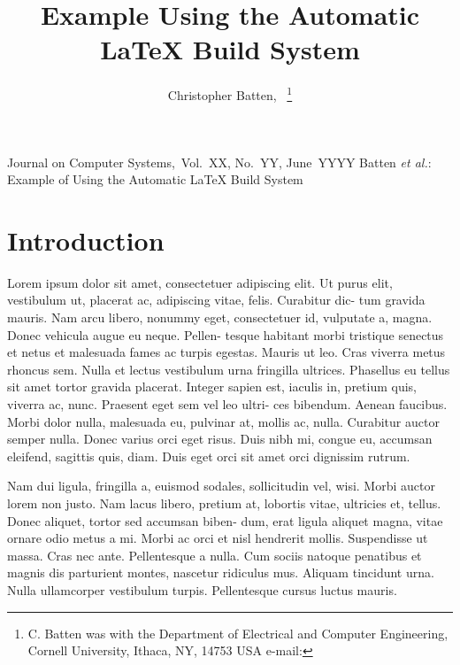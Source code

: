 \newcommand{\hackdocumentclass}{\documentclass}
\begin{document}

\title
{%
  Example Using the Automatic LaTeX Build System
}

\author
{%
  Christopher Batten,~%
  \thanks{C. Batten was with the Department of Electrical and Computer
    Engineering, Cornell University, Ithaca, NY, 14753 USA e-mail:
    }%
}

\markboth
{%
  Journal on Computer Systems,~Vol.~XX, No.~YY, June~YYYY
}%
{%
  Batten \MakeLowercase{\textit{et al.}}: Example of Using the Automatic
  LaTeX Build System
}

\maketitle





\section{Introduction}
\label{sec-intro}

 Lorem ipsum dolor sit amet, consectetuer
adipiscing elit. Ut purus elit, vestibulum ut, placerat ac, adipiscing
vitae, felis. Curabitur dic- tum gravida mauris. Nam arcu libero, nonummy
eget, consectetuer id, vulputate a, magna. Donec vehicula augue eu neque.
Pellen- tesque habitant morbi tristique senectus et netus et malesuada
fames ac turpis egestas. Mauris ut leo. Cras viverra metus rhoncus sem.
Nulla et lectus vestibulum urna fringilla ultrices. Phasellus eu tellus
sit amet tortor gravida placerat. Integer sapien est, iaculis in, pretium
quis, viverra ac, nunc. Praesent eget sem vel leo ultri- ces bibendum.
Aenean faucibus. Morbi dolor nulla, malesuada eu, pulvinar at, mollis ac,
nulla. Curabitur auctor semper nulla. Donec varius orci eget risus. Duis
nibh mi, congue eu, accumsan eleifend, sagittis quis, diam. Duis eget
orci sit amet orci dignissim rutrum.

Nam dui ligula, fringilla a, euismod sodales, sollicitudin vel, wisi.
Morbi auctor lorem non justo. Nam lacus libero, pretium at, lobortis
vitae, ultricies et, tellus. Donec aliquet, tortor sed accumsan biben-
dum, erat ligula aliquet magna, vitae ornare odio metus a mi. Morbi ac
orci et nisl hendrerit mollis. Suspendisse ut massa. Cras nec ante.
Pellentesque a nulla. Cum sociis natoque penatibus et magnis dis
parturient montes, nascetur ridiculus mus. Aliquam tincidunt urna. Nulla
ullamcorper vestibulum turpis. Pellentesque cursus luctus mauris.
\end{document}

